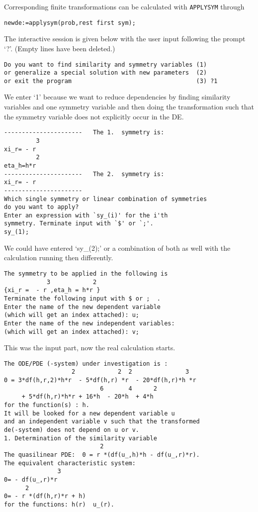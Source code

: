 Corresponding finite
transformations can be calculated with \texttt{APPLYSYM} through
{\small \begin{verbatim}
newde:=applysym(prob,rest first sym);
\end{verbatim}}
The interactive session is given below with the user input following
the prompt `?'. (Empty lines have been deleted.)
{\small \begin{verbatim}
Do you want to find similarity and symmetry variables (1)
or generalize a special solution with new parameters  (2)
or exit the program                                   (3) ?1
\end{verbatim}}
We enter `1' because we want to reduce dependencies by finding similarity
variables and one symmetry variable and then doing the transformation such
that the symmetry variable does not explicitly occur in the DE.
{\small \begin{verbatim}
----------------------   The 1.  symmetry is:
         3
xi_r= - r
         2
eta_h=h*r
----------------------   The 2.  symmetry is:
xi_r= - r
----------------------
Which single symmetry or linear combination of symmetries
do you want to apply?
Enter an expression with `sy_(i)' for the i'th
symmetry. Terminate input with `$' or `;'.
sy_(1);
\end{verbatim}}
We could have entered `sy\_(2);' or a combination of both
as well with the calculation running then
differently.
{\small \begin{verbatim}
The symmetry to be applied in the following is
            3            2
{xi_r =  - r ,eta_h = h*r }
Terminate the following input with $ or ;  .
Enter the name of the new dependent variable
(which will get an index attached): u;
Enter the name of the new independent variables:
(which will get an index attached): v;
\end{verbatim}}
This was the input part, now the real calculation starts.
{\small \begin{verbatim}
The ODE/PDE (-system) under investigation is :
                   2            2  2               3
0 = 3*df(h,r,2)*h*r  - 5*df(h,r) *r  - 20*df(h,r)*h *r
                           6       4      2
     + 5*df(h,r)*h*r + 16*h  - 20*h  + 4*h
for the function(s) : h.
It will be looked for a new dependent variable u
and an independent variable v such that the transformed
de(-system) does not depend on u or v.
1. Determination of the similarity variable
                           2
The quasilinear PDE:  0 = r *(df(u_,h)*h - df(u_,r)*r).
The equivalent characteristic system:
               3
0= - df(u_,r)*r
      2
0= - r *(df(h,r)*r + h)
for the functions: h(r)  u_(r).
\end{verbatim}}

